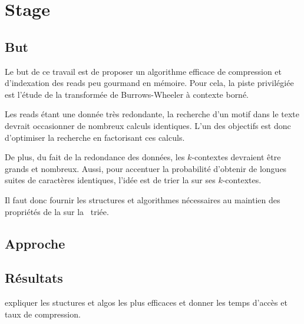 \section{Stage}

\subsection{But}
Le but de ce travail est de proposer un algorithme efficace de compression et d'indexation des reads peu gourmand en mémoire. Pour cela, la piste privilégiée est l'étude de la transformée de Burrows-Wheeler à contexte borné. 

Les reads étant une donnée très redondante, la recherche d'un motif dans le texte devrait occasionner de nombreux calculs identiques. L'un des objectifs est donc d'optimiser la recherche en factorisant ces calculs. 

De plus, du fait de la redondance des données, les $k$-contextes devraient être grands et nombreux. Aussi, pour accentuer la probabilité d'obtenir de longues suites de caractères identiques, l'idée est de trier la \kbwt sur ses $k$-contextes. 

Il faut donc fournir les structures et algorithmes nécessaires au maintien des propriétés de la \bwt sur la \kbwt\ triée.


\subsection{Approche}



\subsection{Résultats} 

expliquer les stuctures et algos les plus efficaces et donner les temps d'accès et taux de compression.

